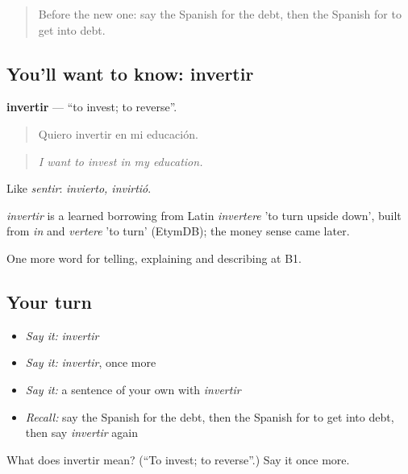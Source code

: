 \label{lesson:ES-C627-invertir}



\begin{quote}
Before the new one: say the Spanish for the debt, then the Spanish for to get into debt.
\end{quote}

\subsection*{You'll want to know: invertir}
\textbf{invertir} — \textquotedblleft{}to invest; to reverse\textquotedblright{}.

\begin{quote}
Quiero invertir en mi educación.
\end{quote}

\begin{quote}
\emph{I want to invest in my education.}
\end{quote}

Like \emph{sentir}: \emph{invierto, invirtió}.

\begin{cousinweb}
\emph{invertir} is a learned borrowing from Latin \emph{invertere} 'to turn upside down', built from \emph{in} and \emph{vertere} 'to turn' (EtymDB); the money sense came later.
\end{cousinweb}

\begin{grammarlens}[title={What you've built}]
One more word for telling, explaining and describing at B1.
\end{grammarlens}

\subsection*{Your turn}
\begin{itemize}
\raggedright
  \item \emph{Say it:} \emph{invertir}
  \item \emph{Say it:} \emph{invertir}, once more
  \item \emph{Say it:} a sentence of your own with \emph{invertir}
  \item \emph{Recall:} say the Spanish for the debt, then the Spanish for to get into debt, then say \emph{invertir} again
\end{itemize}

\begin{tcolorbox}[breakable,colback=teal!4,colframe=teal!35!black,title={Before you move on}]
What does invertir mean? (\textquotedblleft{}To invest; to reverse\textquotedblright{}.) Say it once more.
\end{tcolorbox}
